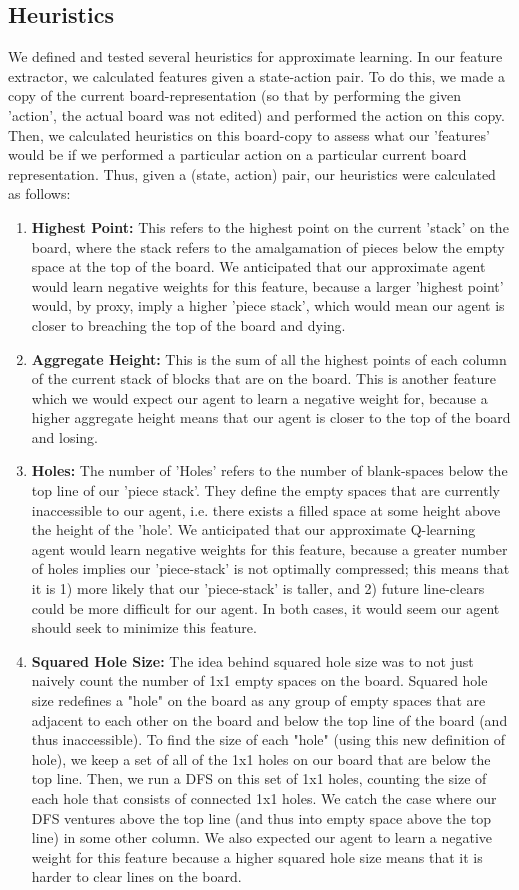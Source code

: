 \documentclass[10pt]{article}
\begin{document}
\subsection{Heuristics}
We defined and tested several heuristics for approximate learning. In our feature extractor, we calculated features given a state-action pair. To do this, we made a copy of the current board-representation (so that by performing the given 'action', the actual board was not edited) and performed the action on this copy. Then, we calculated heuristics on this board-copy to assess what our 'features' would be if we performed a particular action on a particular current board representation. Thus, given a (state, action) pair, our heuristics  were calculated as follows:
\begin{enumerate}
    \item \textbf{Highest Point:}
    This refers to the highest point on the current 'stack' on the board, where the stack refers to the amalgamation of pieces below the empty space at the top of the board. We anticipated that our approximate agent would learn negative weights for this feature, because a larger 'highest point' would, by proxy, imply a higher 'piece stack', which would mean our agent is closer to breaching the top of the board and dying.
    \item \textbf{Aggregate Height:}
    This is the sum of all the highest points of each column of the current stack of blocks that are on the board. This is another feature which we would expect our agent to learn a negative weight for, because a higher aggregate height means that our agent is closer to the top of the board and losing.
    \item \textbf{Holes:}
    The number of 'Holes' refers to the number of blank-spaces below the top line of our 'piece stack'. They define the empty spaces that are currently inaccessible to our agent, i.e. there exists a filled space at some height above the height of the 'hole'. We anticipated that our approximate Q-learning agent would learn negative weights for this feature, because a greater number of holes implies our 'piece-stack' is not optimally compressed; this means that it is 1) more likely that our 'piece-stack' is taller, and 2) future line-clears could be more difficult for our agent. In both cases, it would seem our agent should seek to minimize this feature.
    \item \textbf{Squared Hole Size:}
    The idea behind squared hole size was to not just naively count the number of 1x1 empty spaces on the board. Squared hole size redefines a "hole" on the board as any group of empty spaces that are adjacent to each other on the board and below the top line of the board (and thus inaccessible). To find the size of each "hole" (using this new definition of hole), we keep a set of all of the 1x1 holes on our board that are below the top line. Then, we run a DFS on this set of 1x1 holes, counting the size of each hole that consists of connected 1x1 holes. We catch the case where our DFS ventures above the top line (and thus into empty space above the top line) in some other column. We also expected our agent to learn a negative weight for this feature because a higher squared hole size means that it is harder to clear lines on the board.

\end{enumerate}
\end{document}
